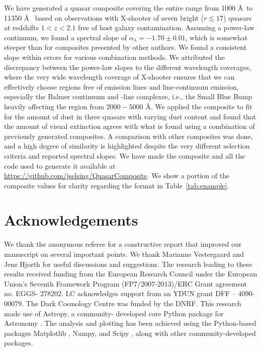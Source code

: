 \documentclass{aa}    %
\newcommand{\Tab}[1]{Table~\ref{tab:#1}}
\newcommand{\tab}[1]{\Tab{#1}}
\newcommand{\sectlabel}[1]{\label{sect:#1}}
\newcommand{\feii}{\ion{Fe}{ii}}
\begin{document}
We have generated a quasar composite covering the entire range from 1000 \AA~to
11350 \AA~ based on observations with X-shooter of seven bright ($r \lesssim 17$)
quasars at redshifts $1 < z < 2.1$ free of host galaxy contamination. Assuming a
power-law continuum, we found a spectral slope of $\alpha_\lambda = -1.70 \pm 0.01$, which is
somewhat steeper than for composites presented by other authors. We
found a consistent slope within errors for various combination methods. We
attributed the discrepancy between the power-law slopes to the different wavelength
coverages, where the very wide wavelength coverage of X-shooter ensures that we
can effectively choose regions free of emission lines and line-continuum
emission, especially the Balmer continuum and \feii-line complexes, i.e., the
Small Blue Bump heavily affecting the region from $2000 - 5000$ \AA. We
applied the composite to fit for the amount of dust in three quasars with
varying dust content and found that the amount of visual extinction 
agrees with what is found using a combination of previously generated
composites. A comparison with other composites was done, and a high degree of similarity is highlighted despite the very different selection criteria and
reported spectral slopes.
We have made the composite and all the code used to generate it available at
\url{https://github.com/jselsing/QuasarComposite}. We show a portion of the
composite values for clarity regarding the format in \tab{example}.

 


\section{Acknowledgements}  \sectlabel{Acknowledgements}

We thank the anonymous referee for a constructive report that improved our
manuscript on several important points. We thank Marianne Vestergaard and Jens
Hjorth for useful discussions and suggestions. The research leading to these
results received funding from the European Research Council under the
European Union’s Seventh Framework Program (FP7/2007-2013)/ERC Grant agreement
no. EGGS- 278202. LC acknowledges support from an YDUN grant DFF – 4090-00079.
The Dark Cosmology Centre was funded by the DNRF. This research made use of
Astropy, a community- developed core Python package for Astronomy
\citep{TheAstropyCollaboration2013}. The analysis and plotting has been achieved
using the Python-based packages Matplotlib \citep{Hunter2007}, Numpy, and Scipy
\citep{VanderWalt2011}, along with other community-developed packages.
\end{document}
